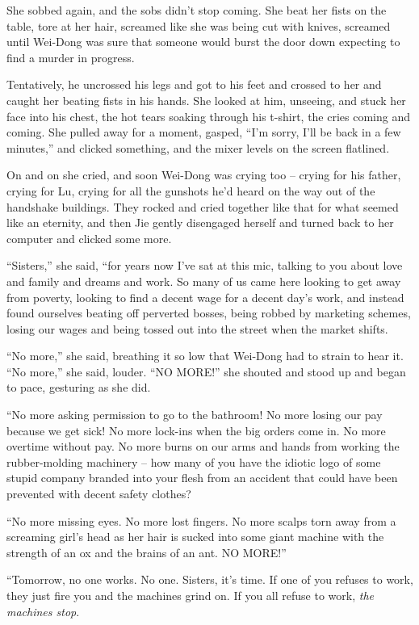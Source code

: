 She sobbed again, and the sobs didn't stop coming. She beat her
fists on the table, tore at her hair, screamed like she was being
cut with knives, screamed until Wei-Dong was sure that someone
would burst the door down expecting to find a murder in progress.

Tentatively, he uncrossed his legs and got to his feet and crossed
to her and caught her beating fists in his hands. She looked at
him, unseeing, and stuck her face into his chest, the hot tears
soaking through his t-shirt, the cries coming and coming. She
pulled away for a moment, gasped, ``I'm sorry, I'll be back in a few
minutes,'' and clicked something, and the mixer levels on the screen
flatlined.

On and on she cried, and soon Wei-Dong was crying too -- crying for
his father, crying for Lu, crying for all the gunshots he'd heard
on the way out of the handshake buildings. They rocked and cried
together like that for what seemed like an eternity, and then Jie
gently disengaged herself and turned back to her computer and
clicked some more.

``Sisters,'' she said, ``for years now I've sat at this mic, talking
to you about love and family and dreams and work. So many of us
came here looking to get away from poverty, looking to find a
decent wage for a decent day's work, and instead found ourselves
beating off perverted bosses, being robbed by marketing schemes,
losing our wages and being tossed out into the street when the
market shifts.

``No more,'' she said, breathing it so low that Wei-Dong had to
strain to hear it. ``No more,'' she said, louder. ``NO MORE!'' she
shouted and stood up and began to pace, gesturing as she did.

``No more asking permission to go to the bathroom! No more losing
our pay because we get sick! No more lock-ins when the big orders
come in. No more overtime without pay. No more burns on our arms
and hands from working the rubber-molding machinery -- how many of
you have the idiotic logo of some stupid company branded into your
flesh from an accident that could have been prevented with decent
safety clothes?

``No more missing eyes. No more lost fingers. No more scalps torn
away from a screaming girl's head as her hair is sucked into some
giant machine with the strength of an ox and the brains of an ant.
NO MORE!''

``Tomorrow, no one works. No one. Sisters, it's time. If one of you
refuses to work, they just fire you and the machines grind on. If
you all refuse to work, \emph{the machines stop}.

